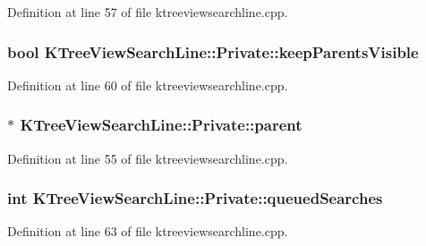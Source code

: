 Definition at line 57 of file ktreeviewsearchline.\+cpp.

\hypertarget{classKTreeViewSearchLine_1_1Private_adc388c2942a71f2ef94b21ef6edd1f2f}{
\subsubsection[{keep\+Parents\+Visible}]{\setlength{\rightskip}{0pt plus 5cm}bool K\+Tree\+View\+Search\+Line\+::\+Private\+::keep\+Parents\+Visible}}\label{classKTreeViewSearchLine_1_1Private_adc388c2942a71f2ef94b21ef6edd1f2f}


Definition at line 60 of file ktreeviewsearchline.\+cpp.

\hypertarget{classKTreeViewSearchLine_1_1Private_a423d46500ac68a1bd6b552ef18d1ef5a}{
\subsubsection[{parent}]{$\ast$ K\+Tree\+View\+Search\+Line\+::\+Private\+::parent}}\label{classKTreeViewSearchLine_1_1Private_a423d46500ac68a1bd6b552ef18d1ef5a}


Definition at line 55 of file ktreeviewsearchline.\+cpp.

\hypertarget{classKTreeViewSearchLine_1_1Private_a58af968b763733896e97cd2097fd1b6e}{
\subsubsection[{queued\+Searches}]{\setlength{\rightskip}{0pt plus 5cm}int K\+Tree\+View\+Search\+Line\+::\+Private\+::queued\+Searches}}\label{classKTreeViewSearchLine_1_1Private_a58af968b763733896e97cd2097fd1b6e}


Definition at line 63 of file ktreeviewsearchline.\+cpp.

